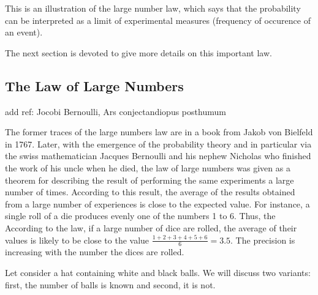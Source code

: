 This is an illustration of the large number law, which says that the probability can be interpreted 
as a limit of experimental measures (frequency of occurence of an event). 
\bigskip

\noindent {}
\bigskip

The next section is devoted to give more details on this important law.


\subsection{The Law of Large Numbers} 
\label{subsec:LawLargeNumbers}

{\Denis add ref: Jocobi Bernoulli, Ars conjectandiopus posthumum}

The former traces of the large numbers law are in a book from Jakob von Bielfeld in 1767.
Later, with the emergence of the probability theory and in particular via the swiss mathematician Jacques Bernoulli
and his nephew Nicholas who finished the work of his uncle when he died, 
the law of large numbers was given as a theorem for describing the result of performing the same experiments
 a large number of times. 
 According to this result, the average of the results obtained from a large number of experiences is close 
 to the expected value. 
For instance, a single roll of a die produces evenly one of the numbers 1 to 6.
Thus, the According to the law, if a large number of dice are rolled, the average of their values 
is likely to be close to the value $\frac{1+2+3+4+5+6}{6}=3.5$.
The precision is increasing with the number the dices are rolled. 

\bigskip

Let consider a hat containing white and black balls.
We will discuss two variants: first, the number of balls is known and second, it is not.

